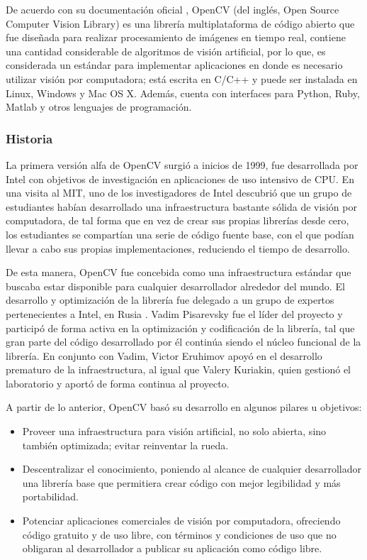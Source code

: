 De acuerdo con su documentación oficial \cite{OpenCV}, OpenCV (del inglés, Open Source Computer Vision Library) es una librería multiplataforma de código abierto que fue diseñada para realizar procesamiento de imágenes en tiempo real, contiene una cantidad considerable de algoritmos de visión artificial, por lo que, es considerada un estándar para implementar aplicaciones en donde es necesario utilizar visión por computadora; está escrita en C/C++ y puede ser instalada en Linux, Windows y Mac OS X. Además, cuenta con interfaces para Python, Ruby, Matlab y otros lenguajes de programación. 

\subsubsection{Historia}
La primera versión alfa de OpenCV surgió a inicios de 1999, fue desarrollada por Intel con objetivos de investigación en aplicaciones de uso intensivo de CPU. En una visita al MIT, uno de los investigadores de Intel descubrió que un grupo de estudiantes habían desarrollado una infraestructura bastante sólida de visión por computadora, de tal forma que en vez de crear sus propias librerías desde cero, los estudiantes se compartían una serie de código fuente base, con el que podían llevar a cabo sus propias implementaciones, reduciendo el tiempo de desarrollo. 

De esta manera, OpenCV fue concebida como una infraestructura estándar que buscaba estar disponible para cualquier desarrollador alrededor del mundo. El desarrollo y optimización de la librería fue delegado a un grupo de expertos pertenecientes a Intel, en Rusia \cite{bradski2008learning}. Vadim Pisarevsky fue el líder del proyecto y participó de forma activa en la optimización y codificación de la librería, tal que gran parte del código desarrollado por él continúa siendo el núcleo funcional de la librería. En conjunto con Vadim, Victor Eruhimov apoyó en el desarrollo prematuro de la infraestructura, al igual que Valery Kuriakin, quien gestionó el laboratorio y aportó de forma continua al proyecto. 

A partir de lo anterior, OpenCV basó su desarrollo en algunos pilares u objetivos:

\begin{itemize}
    \item Proveer una infraestructura para visión artificial, no solo abierta, sino también optimizada; evitar reinventar la rueda.
    \item Descentralizar el conocimiento, poniendo al alcance de cualquier desarrollador una librería base que permitiera crear código con mejor legibilidad y más portabilidad.
    \item Potenciar aplicaciones comerciales de visión por computadora, ofreciendo código gratuito y de uso libre, con términos y condiciones de uso que no obligaran al desarrollador a publicar su aplicación como código libre.
\end{itemize}

